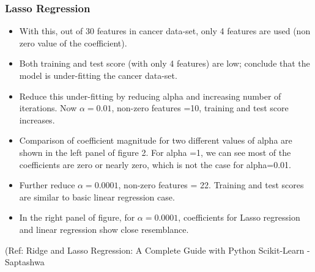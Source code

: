 \begin{frame}[fragile]\frametitle{Lasso Regression}
\begin{itemize}
\item With this, out of 30 features in cancer data-set, only 4 features are used (non zero value of the coefficient).
\item Both training and test score (with only 4 features) are low; conclude that the model is under-fitting the cancer data-set.
\item Reduce this under-fitting by reducing alpha and increasing number of iterations. Now $\alpha = 0.01$, non-zero features =10, training and test score increases.
\item Comparison of coefficient magnitude for two different values of alpha are shown in the left panel of figure 2. For alpha =1, we can see most of the coefficients are zero or nearly zero, which is not the case for alpha=0.01.
\item Further reduce $\alpha =0.0001$, non-zero features = 22. Training and test scores are similar to basic linear regression case.
\item In the right panel of figure, for $\alpha = 0.0001$, coefficients for Lasso regression and linear regression show close resemblance.
\end{itemize}


{\tiny (Ref: Ridge and Lasso Regression: A Complete Guide with Python Scikit-Learn - Saptashwa}
\end{frame}












